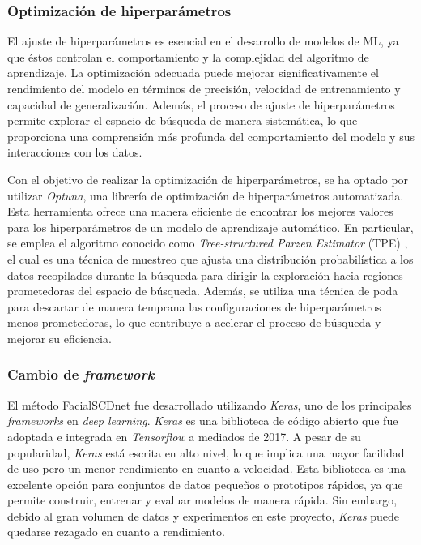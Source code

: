 \subsubsection{Optimización de hiperparámetros}\label{sec-hipertuneo}

El ajuste de hiperparámetros es esencial en el desarrollo de modelos de ML, ya que éstos controlan el comportamiento y la complejidad del algoritmo de aprendizaje. La optimización adecuada puede mejorar significativamente el rendimiento del modelo en términos de precisión, velocidad de entrenamiento y capacidad de generalización. Además, el proceso de ajuste de hiperparámetros permite explorar el espacio de búsqueda de manera sistemática, lo que proporciona una comprensión más profunda del comportamiento del modelo y sus interacciones con los datos.

Con el objetivo de realizar la optimización de hiperparámetros, se ha optado por utilizar \textit{Optuna}, una librería de optimización de hiperparámetros automatizada. Esta herramienta ofrece una manera eficiente de encontrar los mejores valores para los hiperparámetros de un modelo de aprendizaje automático. En particular, se emplea el algoritmo conocido como \textit{Tree-structured Parzen Estimator} (TPE) \cite{71}, el cual es una técnica de muestreo que ajusta una distribución probabilística a los datos recopilados durante la búsqueda para dirigir la exploración hacia regiones prometedoras del espacio de búsqueda. Además, se utiliza una técnica de poda para descartar de manera temprana las configuraciones de hiperparámetros menos prometedoras, lo que contribuye a acelerar el proceso de búsqueda y mejorar su eficiencia.


\subsubsection{Cambio de \textit{framework}}

El método FacialSCDnet fue desarrollado utilizando \textit{Keras}, uno de los principales \textit{frameworks} en \textit{deep learning}. \textit{Keras} es una biblioteca de código abierto que fue adoptada e integrada en \textit{Tensorflow} a mediados de 2017. A pesar de su popularidad, \textit{Keras} está escrita en alto nivel, lo que implica una mayor facilidad de uso pero un menor rendimiento en cuanto a velocidad. Esta biblioteca es una excelente opción para conjuntos de datos pequeños o prototipos rápidos, ya que permite construir, entrenar y evaluar modelos de manera rápida. Sin embargo, debido al gran volumen de datos y experimentos en este proyecto, \textit{Keras} puede quedarse rezagado en cuanto a rendimiento.

